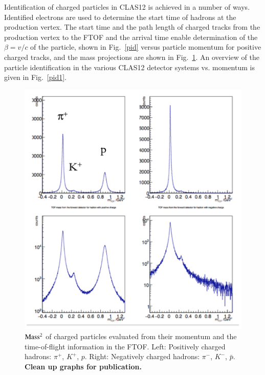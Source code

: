 \documentclass[final,3p,twocolumn]{elsarticle}
\begin{document}
 Identification of charged particles in CLAS12 is achieved in a number of ways. Identified electrons are used to determine the start time of hadrons at the production vertex. The start time and the path length of charged tracks from the production vertex to the FTOF and the arrival time enable determination of the $\beta = v/c$ of the particle, shown in Fig.~\ref{pid} versus particle momentum for positive charged tracks, and the mass projections are shown in Fig.~\ref{pid-1D}.  An overview of the particle identification in the various CLAS12 detector systems vs. momentum is given in Fig.~\ref{pid1}. 
 \begin{figure}[htbp!]
\centerline{\includegraphics[width=1.0\columnwidth]{pid-1d.png}}
\caption{{$\rm Mass^2$} of charged particles evaluated from their momentum and the time-of-flight information in the FTOF. Left: Positively charged hadrons: $\pi^+$, 
$K^+$, $p$. Right: Negatively charged hadrons: $\pi^-$, $K^-$, ${\bar{p}}$. {\bf Clean up graphs for publication.} }
\label{pid-1D}
\end{figure} 
\end{document}
